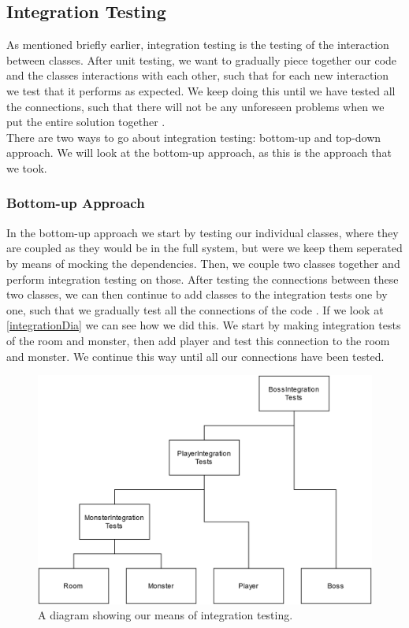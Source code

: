 \subsection{Integration Testing}
As mentioned briefly earlier, integration testing is the testing of the interaction between classes. After unit testing, we want to gradually piece together our code and the classes interactions with each other, such that for each new interaction we test that it performs as expected. We keep doing this until we have tested all the connections, such that there will not be any unforeseen problems when we put the entire solution together \cite{TestingBlackbox}. \\
There are two ways to go about integration testing: bottom-up and top-down approach. We will look at the bottom-up approach, as this is the approach that we took. 
\subsubsection{Bottom-up Approach}
In the bottom-up approach we start by testing our individual classes, where they are coupled as they would be in the full system, but were we keep them seperated by means of mocking the dependencies. Then, we couple two classes together and perform integration testing on those. After testing the connections between these two classes, we can then continue to add classes to the integration tests one by one, such that we gradually test all the connections of the code \cite{TestingBlackbox}. If we look at \autoref{integrationDia} we can see how we did this. We start by making integration tests of the room and monster, then add player and test this connection to the room and monster. We continue this way until all our connections have been tested.
\begin{figure}
    \centering
    \includegraphics[width=0.7\linewidth]{Materials/TestingTheory/IntegrationDiagram}
    \caption{A diagram showing our means of integration testing.}
    \label{integrationDia}
\end{figure}
